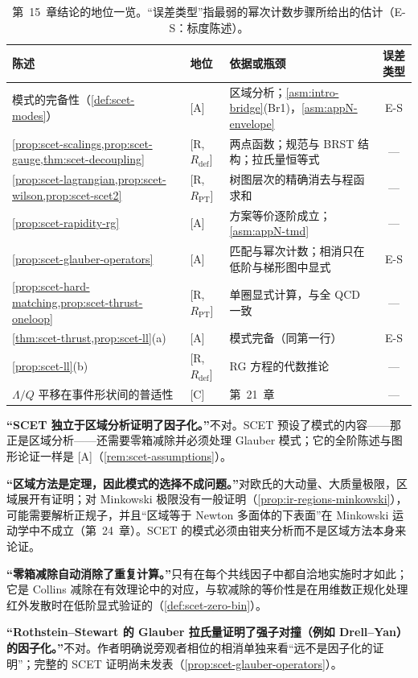 \begin{table}[htbp]
\centering\small
\renewcommand{\arraystretch}{1.15}
\begin{tabular}{@{}p{}lp{}c@{}}
\toprule
陈述 & 地位 & 依据或瓶颈 & 误差类型 \\
\midrule
模式的完备性（\cref{def:scet-modes}） & [A] & 区域分析；\cref{asm:intro-bridge}(Br1)，\cref{asm:appN-envelope} & E-S \\
\cref{prop:scet-scalings,prop:scet-gauge,thm:scet-decoupling} & [R, $R_{\mathrm{def}}$] & 两点函数；规范与 BRST 结构；拉氏量恒等式 & — \\
\cref{prop:scet-lagrangian,prop:scet-wilson,prop:scet-scet2} & [R, $R_{\mathrm{PT}}$] & 树图层次的精确消去与程函求和 & — \\
\cref{prop:scet-rapidity-rg} & [A] & 方案等价逐阶成立；\cref{asm:appN-tmd} & — \\
\cref{prop:scet-glauber-operators} & [A] & 匹配与幂次计数；相消只在低阶与梯形图中显式 & E-S \\
\cref{prop:scet-hard-matching,prop:scet-thrust-oneloop} & [R, $R_{\mathrm{PT}}$] & 单圈显式计算，与全 QCD 一致 & — \\
\cref{thm:scet-thrust,prop:scet-ll}(a) & [A] & 模式完备（同第一行） & E-S \\
\cref{prop:scet-ll}(b) & [R, $R_{\mathrm{def}}$] & RG 方程的代数推论 & — \\
$\Lambda/Q$ 平移在事件形状间的普适性 & [C] & 第~21~章 & — \\
\bottomrule
\end{tabular}
\caption{第~15~章结论的地位一览。“误差类型”指最弱的幂次计数步骤所给出的估计（E-S：标度陈述）。}
\label{tab:scet-status}
\end{table}

\begin{tcolorbox}[enhanced,breakable,title=常见误解,fonttitle=\bfseries,
  colback=gray!3!white,colframe=gray!55!black,boxrule=0.6pt,arc=2pt,
  left=5pt,right=5pt,top=3pt,bottom=3pt,before skip=6pt,after skip=6pt]
\textbf{“SCET 独立于区域分析证明了因子化。”}不对。SCET 预设了模式的内容——那正是区域分析——还需要零箱减除并必须处理 Glauber 模式；它的全阶陈述与图形论证一样是 [A]（\cref{rem:scet-assumptions}）。\par
\textbf{“区域方法是定理，因此模式的选择不成问题。”}对欧氏的大动量、大质量极限，区域展开有证明\cite{Smirnov:1990rz}；对 Minkowski 极限没有一般证明（\cref{prop:ir-regions-minkowski}），可能需要解析正规子，并且“区域等于 Newton 多面体的下表面”在 Minkowski 运动学中不成立\cite{Gardi:2024axt}（第~24~章）。SCET 的模式必须由钳夹分析而不是区域方法本身来论证。\par
\textbf{“零箱减除自动消除了重复计算。”}只有在每个共线因子中都自洽地实施时才如此；它是 Collins 减除在有效理论中的对应，与软减除的等价性是在用维数正规化处理红外发散时在低阶显式验证的（\cref{def:scet-zero-bin}）。\par
\textbf{“Rothstein--Stewart 的 Glauber 拉氏量证明了强子对撞（例如 Drell--Yan）的因子化。”}不对。作者明确说旁观者相位的相消单独来看“远不是因子化的证明”；完整的 SCET 证明尚未发表（\cref{prop:scet-glauber-operators}）。
\end{tcolorbox}

